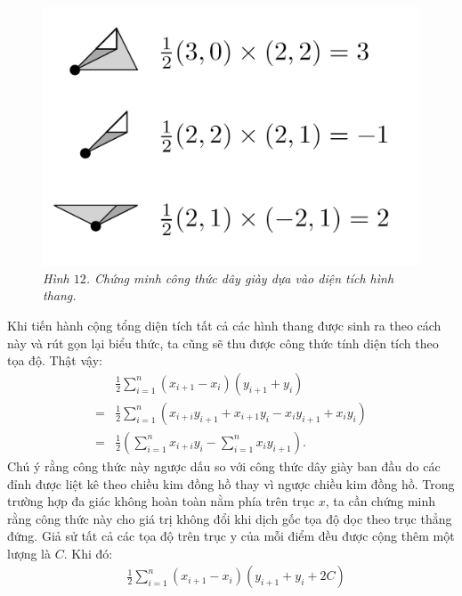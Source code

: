 \begin{multicols}{2}
	\begin{figure}[H]
		\vspace*{-5pt}
		\centering
		\captionsetup{labelformat= empty, justification=centering}
		\includegraphics[width= 1\linewidth]{15}
		\caption{\small\textit{\color{toanhocdoisong}Hình $12$. Chứng minh công thức dây giày dựa vào diện tích hình thang.}}
		\vspace*{-10pt}
	\end{figure}
	Khi tiến hành cộng tổng diện tích tất cả các hình thang được sinh ra theo cách này và rút gọn lại biểu thức, ta cũng sẽ thu được công thức tính diện tích theo tọa độ. Thật vậy:
	\begin{align*}
		&\frac{1}{2}\sum\limits_{i = 1}^n \left( {{x_{i + 1}} - {x_i}} \right)\left( {{y_{i + 1}} + {y_i}} \right) \\
		= &\frac{1}{2}\sum\limits_{i = 1}^n \left( {{x_{i + i}}{y_{i + 1}} + {x_{i + 1}}{y_i} - {x_i}{y_{i + 1}} + {x_i}{y_i}} \right) \\
		= &\frac{1}{2}\left( {\sum\limits_{i = 1}^n {{x_{i + i}}{y_i} - } \sum\limits_{i = 1}^n {{x_i}{y_{i + 1}}} } \right) .
	\end{align*}
	Chú ý rằng công thức này ngược dấu so với công thức dây giày ban đầu do các đỉnh được liệt kê theo chiều kim đồng hồ thay vì ngược chiều kim đồng hồ.
	\vskip 0.1cm
	Trong trường hợp đa giác không hoàn toàn nằm phía trên trục $x$, ta cần chứng minh rằng công thức này cho giá trị không đổi khi dịch gốc tọa độ dọc theo trục thẳng đứng. Giả sử tất cả các tọa độ trên trục y của mỗi điểm đều được cộng thêm một lượng là $C$. Khi đó:
	\begin{align*}
		&\frac{1}{2}\sum\limits_{i = 1}^n \left( {{x_{i + 1}} - {x_i}} \right)\left( {{y_{i + 1}} + {y_i} + 2C} \right) \\

\end{align*}
\end{multicols}
